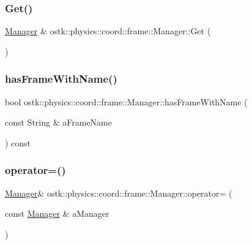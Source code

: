 \subsubsection{\texorpdfstring{Get()}{Get()}}
{\footnotesize\ttfamily \hyperlink{classostk_1_1physics_1_1coord_1_1frame_1_1_manager}{Manager} \& ostk\+::physics\+::coord\+::frame\+::\+Manager\+::\+Get (\begin{DoxyParamCaption}{ }\end{DoxyParamCaption})\hspace{0.3cm}{\ttfamily [static]}}

\mbox{\label{classostk_1_1physics_1_1coord_1_1frame_1_1_manager_ac353df7eaa41ec705c7728afef0aff34}} 
\subsubsection{\texorpdfstring{has\+Frame\+With\+Name()}{hasFrameWithName()}}
{\footnotesize\ttfamily bool ostk\+::physics\+::coord\+::frame\+::\+Manager\+::has\+Frame\+With\+Name (\begin{DoxyParamCaption}\item[{const String \&}]{a\+Frame\+Name }\end{DoxyParamCaption}) const}

\mbox{\label{classostk_1_1physics_1_1coord_1_1frame_1_1_manager_a6503baa568803e9943a6685865269b6f}} 
\subsubsection{\texorpdfstring{operator=()}{operator=()}}
{\footnotesize\ttfamily \hyperlink{classostk_1_1physics_1_1coord_1_1frame_1_1_manager}{Manager}\& ostk\+::physics\+::coord\+::frame\+::\+Manager\+::operator= (\begin{DoxyParamCaption}\item[{const \hyperlink{classostk_1_1physics_1_1coord_1_1frame_1_1_manager}{Manager} \&}]{a\+Manager }\end{DoxyParamCaption})\hspace{0.3cm}{\ttfamily [delete]}}

